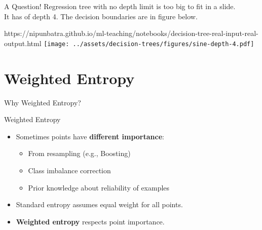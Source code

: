 \documentclass[usenames,dvipsnames]{beamer}
\begin{document}
\begin{frame}{A Question!}
Regression tree with no depth limit is too big to fit in a slide. \\
It has of depth 4. The decision boundaries are in figure below.\\
\begin{center}
	\begin{notebookbox}{https://nipunbatra.github.io/ml-teaching/notebooks/decision-tree-real-input-real-output.html}
		\texttt{[image: ../assets/decision-trees/figures/sine-depth-4.pdf]}
	  \end{notebookbox}
\end{center}
\end{frame}


\section{Weighted Entropy}

\begin{frame}{Why Weighted Entropy?}
\begin{keypointsbox}{Weighted Entropy}
\begin{itemize}
\item Sometimes points have \textbf{different importance}:
  \begin{itemize}
    \item From resampling (e.g., Boosting)
    \item Class imbalance correction
    \item Prior knowledge about reliability of examples
  \end{itemize}
\item Standard entropy assumes equal weight for all points.
\item \textbf{Weighted entropy} respects point importance.
\end{itemize}
\end{keypointsbox}
\end{frame}
\end{document}
